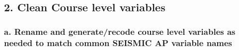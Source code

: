 \documentclass[]{article}
\newenvironment{Shaded}{\begin{snugshade}}{\end{snugshade}}
\newcommand{\CommentTok}[1]{\textcolor[rgb]{0.56,0.35,0.01}{\textit{#1}}}
\begin{document}
\begin{Shaded}
\begin{Highlighting}[]
{{{{{{{{{\CommentTok{# etc...}
\end{Highlighting}
\end{Shaded}

\subsection{2. Clean Course level
variables}\label{clean-course-level-variables}

\subsubsection{a. Rename and generate/recode course level variables as
needed to match common SEISMIC AP variable
names}\label{a.-rename-and-generaterecode-course-level-variables-as-needed-to-match-common-seismic-ap-variable-names}
\end{document}
